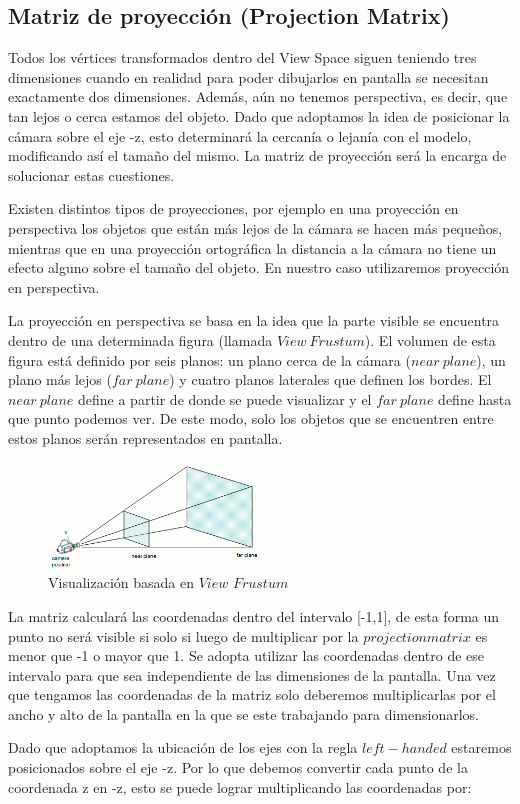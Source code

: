 \documentclass[a4paper]{article}
\begin{document}
\subsection{Matriz de proyección (Projection Matrix)} \label{projection}
Todos los vértices transformados dentro del View Space siguen teniendo tres dimensiones cuando en realidad para poder dibujarlos en pantalla se necesitan exactamente dos dimensiones. Además, aún no tenemos perspectiva, es decir, que tan lejos o cerca estamos del objeto. Dado que adoptamos la idea de posicionar la cámara sobre el eje -z, esto determinará la cercanía o lejanía con el modelo, modificando así el tamaño del mismo. La matriz de proyección será la encarga de solucionar estas cuestiones.
\par Existen distintos tipos de proyecciones, por ejemplo en una proyección en perspectiva los objetos que están más lejos de la cámara se hacen más pequeños, mientras que en una proyección ortográfica la distancia a la cámara no tiene un efecto alguno sobre el tamaño del objeto. En nuestro caso utilizaremos proyección en perspectiva.
\par La proyección en perspectiva se basa en la idea que la parte visible se encuentra dentro de una determinada figura (llamada $View \ Frustum$). El volumen de esta figura está definido por seis planos: un plano cerca de la cámara ($near \ plane$), un plano más lejos ($far \ plane$) y cuatro planos laterales que definen los bordes. El $near \ plane$  define a partir de donde se puede visualizar y el $far \ plane$ define hasta que punto podemos ver. De este modo, solo los objetos que se encuentren entre estos planos serán representados en pantalla. 
 
 
\begin{figure}[h]
    \centering
    \includegraphics[width=0.50\textwidth]{Imagenes/b.png}
    \caption{Visualización basada en $View $ $Frustum$}
    \label{fig:mesh1}
\end{figure}
La matriz calculará las coordenadas dentro del intervalo [-1,1], de esta forma un punto no será visible si solo si luego de multiplicar por la $projection matrix$ es menor que -1 o mayor que 1. Se adopta utilizar las coordenadas dentro de ese intervalo para que sea independiente de las dimensiones de la pantalla. Una vez que tengamos las coordenadas de la matriz solo deberemos multiplicarlas por el ancho y alto de la pantalla en la que se este trabajando para dimensionarlos.
\par Dado que adoptamos la ubicación de los ejes con la regla $left-handed$ estaremos posicionados sobre el eje -z. Por lo que debemos convertir cada punto de la coordenada z en -z, esto se puede lograr multiplicando las coordenadas por: 
\end{document}
